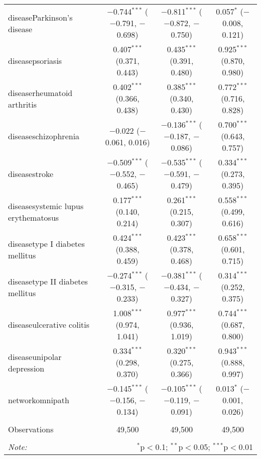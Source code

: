 \begin{table}[!htbp]
\begin{tabular}{@{\extracolsep{5pt}}lccc}
  diseaseParkinson's disease & $-$0.744$^{***}$ ($-$0.791, $-$0.698) & $-$0.811$^{***}$ ($-$0.872, $-$0.750) & 0.057$^{*}$ ($-$0.008, 0.121) \\ 
  diseasepsoriasis & 0.407$^{***}$ (0.371, 0.443) & 0.435$^{***}$ (0.391, 0.480) & 0.925$^{***}$ (0.870, 0.980) \\ 
  diseaserheumatoid arthritis & 0.402$^{***}$ (0.366, 0.438) & 0.385$^{***}$ (0.340, 0.430) & 0.772$^{***}$ (0.716, 0.828) \\ 
  diseaseschizophrenia & $-$0.022 ($-$0.061, 0.016) & $-$0.136$^{***}$ ($-$0.187, $-$0.086) & 0.700$^{***}$ (0.643, 0.757) \\ 
  diseasestroke & $-$0.509$^{***}$ ($-$0.552, $-$0.465) & $-$0.535$^{***}$ ($-$0.591, $-$0.479) & 0.334$^{***}$ (0.273, 0.395) \\ 
  diseasesystemic lupus erythematosus & 0.177$^{***}$ (0.140, 0.214) & 0.261$^{***}$ (0.215, 0.307) & 0.558$^{***}$ (0.499, 0.616) \\ 
  diseasetype I diabetes mellitus & 0.424$^{***}$ (0.388, 0.459) & 0.423$^{***}$ (0.378, 0.468) & 0.658$^{***}$ (0.601, 0.715) \\ 
  diseasetype II diabetes mellitus & $-$0.274$^{***}$ ($-$0.315, $-$0.233) & $-$0.381$^{***}$ ($-$0.434, $-$0.327) & 0.314$^{***}$ (0.252, 0.375) \\ 
  diseaseulcerative colitis & 1.008$^{***}$ (0.974, 1.041) & 0.977$^{***}$ (0.936, 1.019) & 0.744$^{***}$ (0.687, 0.800) \\ 
  diseaseunipolar depression & 0.334$^{***}$ (0.298, 0.370) & 0.320$^{***}$ (0.275, 0.366) & 0.943$^{***}$ (0.888, 0.997) \\ 
  networkomnipath & $-$0.145$^{***}$ ($-$0.156, $-$0.134) & $-$0.105$^{***}$ ($-$0.119, $-$0.091) & 0.013$^{*}$ ($-$0.001, 0.026) \\ 
 \hline \\[-1.8ex] 
Observations & 49,500 & 49,500 & 49,500 \\ 
\hline 
\hline \\[-1.8ex] 
\textit{Note:}  & \multicolumn{3}{r}{$^{*}$p$<$0.1; $^{**}$p$<$0.05; $^{***}$p$<$0.01} \\ 
\end{tabular} 
\end{table} 
